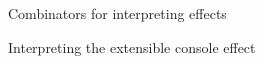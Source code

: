 \begin{figure}
  
  \caption{Combinators for interpreting effects}
  \label{fig:interpreting}
\end{figure}

\begin{figure}
  
  \caption{Interpreting the extensible console effect}
  \label{fig:run-console}
\end{figure}
